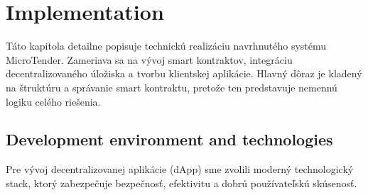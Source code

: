 \chapter{Implementation}
\label{chap:implementation}

Táto kapitola detailne popisuje technickú realizáciu navrhnutého systému MicroTender. Zameriava sa na vývoj smart kontraktov, integráciu decentralizovaného úložiska a tvorbu klientskej aplikácie. Hlavný dôraz je kladený na štruktúru a správanie smart kontraktu, pretože ten predstavuje nemennú logiku celého riešenia.

\section{Development environment and technologies}

Pre vývoj decentralizovanej aplikácie (dApp) sme zvolili moderný technologický stack, ktorý zabezpečuje bezpečnosť, efektivitu a dobrú používateľskú skúsenosť.

